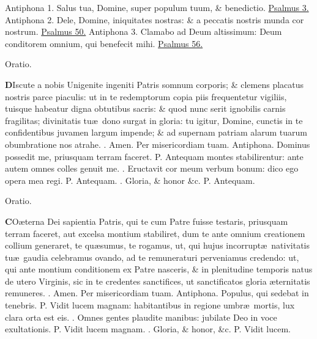 \documentclass[letter,11pt]{book}
\makeatletter
\DeclareRobustCommand{\Vbar}{\vers@resp{-0.1em}{V}}
\DeclareRobustCommand{\Rbar}{\vers@resp{0pt}{R}}
\newcommand{\vers@resp@sym}{\raisebox{0.2ex}{\rotatebox[origin=c]{-20}{$\m@th\rceil$}}}
\newcommand{\vers@resp}[2]{%
  {\ooalign{\hidewidth\kern#1\vers@resp@sym\hidewidth\cr#2\cr}}%
}%
\def\P{\color{Red} P. \color{black}}
\def\V{\color{Red} \Vbar . \color{black}}
\def\R{\color{Red} \Rbar . \color{black}}
\makeatother
\begin{document}
\begin{multicols*}{2}
\newline \color{Red} Antiphona 1. \color{black} Salus tua, Domine, super populum tuum, \& benedictio. \color{Red} \hyperlink{ps3}{Psalmus 3.} \color{black}
\newline \color{Red} Antiphona 2. \color{black} Dele, Domine, iniquitates nostras: \& a peccatis nostris munda cor nostrum. \color{Red} \hyperlink{ps50}{Psalmus 50.} \color{black}
\newline \color{Red} Antiphona 3. \color{black} Clamabo ad Deum altissimum: Deum conditorem omnium, qui benefecit mihi. \color{Red} \hyperlink{ps56}{Psalmus 56.} \color{black}
\vspace{-.5em} \begin{center} \color{Red} Oratio. \color{black} \end{center} \vspace{-.5em}
\lettrine[lines=2]{\bfseries \color{Red} D}{}Iscute a nobis Unigenite ingeniti Patris somnum corporis; \& clemens placatus nostris parce piaculis: ut in te redemptorum copia piis frequentetur vigiliis, tuisque habeatur digna obtutibus sacris: \& quod nunc serit ignobilis carnis fragilitas; divinitatis tu\ae \ dono surgat in gloria: tu igitur, Domine, cunctis in te confidentibus juvamen largum impende; \& ad supernam patriam alarum tuarum obumbratione nos atrahe. \R Amen. Per misericordiam tuam.
\newline \color{Red} Antiphona. \color{black} Dominus possedit me, priusquam terram faceret. \P Antequam montes stabilirentur: ante autem omnes colles genuit me. \V Eructavit cor meum verbum bonum: dico ego opera mea regi. \P Antequam. \V Gloria, \& honor \&c. \P Antequam.
\vspace{-.5em} \begin{center} \color{Red} Oratio. \color{black} \end{center} \vspace{-.5em}
\lettrine[lines=2]{\bfseries \color{Red} C}{}O\ae terna Dei sapientia Patris, qui te cum Patre fuisse testaris, priusquam terram faceret, aut excelsa montium stabiliret, dum te ante omnium creationem collium generaret, te qu\ae sumus, te rogamus, ut, qui hujus incorrupt\ae \ nativitatis tu\ae \ gaudia celebramus ovando, ad te remuneraturi perveniamus credendo: ut, qui ante montium conditionem ex Patre nasceris, \& in plenitudine temporis natus de utero Virginis, sic in te credentes sanctifices, ut sanctificatos gloria \ae ternitatis remuneres. \R Amen. Per misericordiam tuam.
\newline \color{Red} Antiphona. \color{black} Populus, qui sedebat in tenebris. \P Vidit lucem magnam: habitantibus in regione umbr\ae \ mortis, lux clara orta est eis. \V Omnes gentes plaudite manibus: jubilate Deo in voce exultationis. \P Vidit lucem magnam. \V Gloria, \& honor, \&c. \P Vidit lucem.

\end{multicols*}
\end{document}
